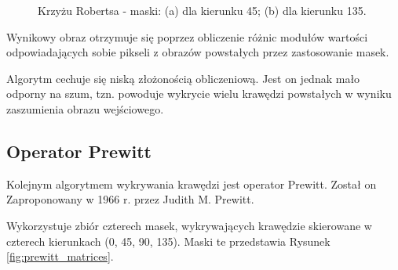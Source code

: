 \documentclass[a4paper,twocolumn,12pt]{article}
\begin{document}
\begin{figure}[!ht]
 \begin{center}
 \end{center}
 \caption{
  Krzyżu Robertsa - maski:
  (a) dla kierunku 45\textdegree;
  (b) dla kierunku 135\textdegree.
 }
 \label{fig:roberts_matrices}
\end{figure}

Wynikowy obraz otrzymuje się poprzez obliczenie różnic modułów wartości odpowiadających sobie pikseli z obrazów powstałych przez zastosowanie masek.

Algorytm cechuje się niską złożonością obliczeniową.
Jest on jednak mało odporny na szum, tzn. powoduje wykrycie wielu krawędzi powstałych w wyniku zaszumienia obrazu wejściowego.


\subsection{Operator Prewitt}

Kolejnym algorytmem wykrywania krawędzi jest operator Prewitt.
Został on Zaproponowany w 1966 r. przez Judith M. Prewitt.

Wykorzystuje zbiór czterech masek, wykrywających krawędzie skierowane w czterech kierunkach (0\textdegree, 45\textdegree, 90\textdegree, 135\textdegree).
Maski te przedstawia Rysunek \ref{fig:prewitt_matrices}.
\end{document}
